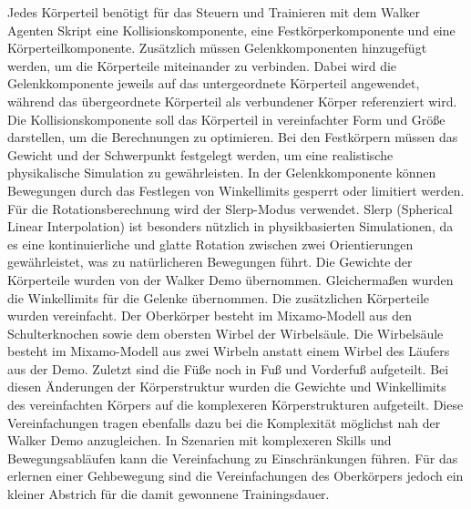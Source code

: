Jedes Körperteil benötigt für das Steuern und Trainieren mit dem Walker Agenten Skript eine Kollisionskomponente, eine Festkörperkomponente und eine Körperteilkomponente. Zusätzlich müssen Gelenkkomponenten hinzugefügt werden, um die Körperteile miteinander zu verbinden. Dabei wird die Gelenkkomponente jeweils auf das untergeordnete Körperteil angewendet, während das übergeordnete Körperteil als verbundener Körper referenziert wird. Die Kollisionskomponente soll das Körperteil in vereinfachter Form und Größe darstellen, um die Berechnungen zu optimieren. Bei den Festkörpern müssen das Gewicht und der Schwerpunkt festgelegt werden, um eine realistische physikalische Simulation zu gewährleisten. In der Gelenkkomponente können Bewegungen durch das Festlegen von Winkellimits gesperrt oder limitiert werden. Für die Rotationsberechnung wird der Slerp-Modus verwendet. Slerp (Spherical Linear Interpolation) ist besonders nützlich in physikbasierten Simulationen, da es eine kontinuierliche und glatte Rotation zwischen zwei Orientierungen gewährleistet, was zu natürlicheren Bewegungen führt. Die Gewichte der Körperteile wurden von der Walker Demo übernommen. Gleichermaßen wurden die Winkellimits für die Gelenke übernommen. Die zusätzlichen Körperteile wurden vereinfacht. Der Oberkörper besteht im Mixamo-Modell aus den Schulterknochen sowie dem obersten Wirbel der Wirbelsäule. Die Wirbelsäule besteht im Mixamo-Modell aus zwei Wirbeln anstatt einem Wirbel des Läufers aus der Demo. Zuletzt sind die Füße noch in Fuß und Vorderfuß aufgeteilt. Bei diesen Änderungen der Körperstruktur wurden die Gewichte und Winkellimits des vereinfachten Körpers auf die komplexeren Körperstrukturen aufgeteilt. Diese Vereinfachungen tragen ebenfalls dazu bei die Komplexität möglichst nah der Walker Demo anzugleichen. In Szenarien mit komplexeren Skills und Bewegungsabläufen kann die Vereinfachung zu Einschränkungen führen. Für das erlernen einer Gehbewegung sind die Vereinfachungen des Oberkörpers jedoch ein kleiner Abstrich für die damit gewonnene Trainingsdauer.

